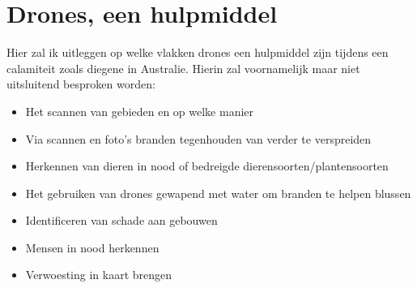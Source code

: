 

\chapter{Drones, een hulpmiddel}

Hier zal ik uitleggen op welke vlakken drones een hulpmiddel zijn tijdens een calamiteit zoals diegene in Australie. Hierin zal voornamelijk maar niet uitsluitend besproken worden:
\begin{itemize}
    \item Het scannen van gebieden en op welke manier
    \item Via scannen en foto's branden tegenhouden van verder te verspreiden
    \item Herkennen van dieren in nood of bedreigde dierensoorten/plantensoorten
    \item Het gebruiken van drones gewapend met water om branden te helpen blussen
    \item Identificeren van schade aan gebouwen
    \item Mensen in nood herkennen
    \item Verwoesting in kaart brengen
\end{itemize}
